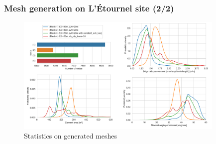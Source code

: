 \documentclass[10pt]{beamer}
\begin{document}
\begin{frame}\frametitle{Mesh generation on L'\'Etournel site (2/2)}

\begin{figure}[H]
    \centering
    \includegraphics[width=10cm]{figures/etournel_result.png}
    \caption{Statistics on generated meshes}
\end{figure}

\end{frame}






\end{document}
